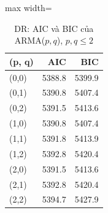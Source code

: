 \begin{table}[H]
\centering\footnotesize
\caption{DR: AIC và BIC của ARMA($p,q$), $p,q\le2$}\label{tab:tab_b11_13_dr_grid}
\begin{adjustbox}{max width=\linewidth}
\begin{tabular}{|l|r|r|}
\toprule
(p, q) & AIC & BIC \\
\midrule
(0,0) & 5388.8 & 5399.9 \\
(0,1) & 5390.8 & 5407.4 \\
(0,2) & 5391.5 & 5413.6 \\
(1,0) & 5390.8 & 5407.4 \\
(1,1) & 5391.8 & 5413.9 \\
(1,2) & 5392.8 & 5420.4 \\
(2,0) & 5391.5 & 5413.6 \\
(2,1) & 5392.8 & 5420.4 \\
(2,2) & 5394.7 & 5427.9 \\
\bottomrule
\end{tabular}
\end{adjustbox}
\end{table}
